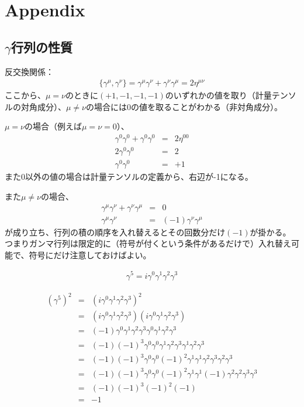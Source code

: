 
\chapter{Appendix}
\section{$\gamma$行列の性質}
反交換関係：
\begin{eqnarray}
  \{ \gamma^\mu, \gamma^\nu \} = \gamma^\mu\gamma^\nu + \gamma^\nu\gamma^\mu = 2\eta^{\mu\nu}
\end{eqnarray}
ここから、$\mu=\nu$のときに$(+1,-1,-1,-1)$のいずれかの値を取り（計量テンソルの対角成分）、$\mu\neq\nu$の場合には0の値を取ることがわかる（非対角成分）。

$\mu=\nu$の場合（例えば$\mu=\nu=0$）、
\begin{eqnarray}
  \gamma^0\gamma^0 + \gamma^0\gamma^0 &=& 2\eta^{00}\\
  2\gamma^0\gamma^0  &=& 2 \\
  \gamma^0\gamma^0   &=& +1 
\end{eqnarray}
また0以外の値の場合は計量テンソルの定義から、右辺が-1になる。

また$\mu \neq \nu$の場合、
\begin{eqnarray}
  \gamma^\mu\gamma^\nu + \gamma^\nu\gamma^\mu &=& 0 \\
  \gamma^\mu\gamma^\nu &=& (-1)\gamma^\nu\gamma^\mu 
\end{eqnarray}
が成り立ち、行列の積の順序を入れ替えるとその回数分だけ$(-1)$が掛かる。
つまりガンマ行列は限定的に（符号が付くという条件があるだけで）入れ替え可能で、符号にだけ注意しておけばよい。


\begin{eqnarray}
  \gamma^5 = i\gamma^0\gamma^1\gamma^2\gamma^3
\end{eqnarray}

\begin{eqnarray}
  (\gamma^5)^2 
  &=& (i\gamma^0\gamma^1\gamma^2\gamma^3)^2 \\
  &=& (i\gamma^0\gamma^1\gamma^2\gamma^3)(i\gamma^0\gamma^1\gamma^2\gamma^3) \\
  &=& (-1)\gamma^0\gamma^1\gamma^2\gamma^3\gamma^0\gamma^1\gamma^2\gamma^3 \\
  &=& (-1)(-1)^3\gamma^0\gamma^0\gamma^1\gamma^2\gamma^3\gamma^1\gamma^2\gamma^3 \\
  &=& (-1)(-1)^3\gamma^0\gamma^0(-1)^2\gamma^1\gamma^1\gamma^2\gamma^3\gamma^2\gamma^3 \\
  &=& (-1)(-1)^3\gamma^0\gamma^0(-1)^2\gamma^1\gamma^1(-1)\gamma^2\gamma^2\gamma^3\gamma^3 \\
  &=& (-1)(-1)^3(-1)^2(-1) \\
  &=& -1
\end{eqnarray}


